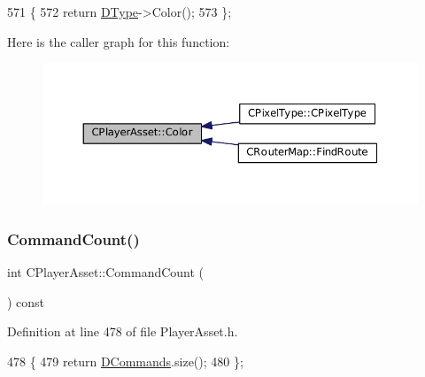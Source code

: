 \begin{DoxyCode}
571                                   \{
572             \textcolor{keywordflow}{return} \hyperlink{classCPlayerAsset_a5d61f73471e1e6f0a6ab15f2ffa7b359}{DType}->Color();  
573         \};
\end{DoxyCode}
Here is the caller graph for this function\+:
\nopagebreak
\begin{figure}[H]
\begin{center}
\leavevmode
\includegraphics[width=350pt]{classCPlayerAsset_a969e6e60c6343186d2b9a6cddd6654f8_icgraph}
\end{center}
\end{figure}
\hypertarget{classCPlayerAsset_a5349f1cee794bd34f2255aa6b3177344}{}\label{classCPlayerAsset_a5349f1cee794bd34f2255aa6b3177344} 
\subsubsection{\texorpdfstring{Command\+Count()}{CommandCount()}}
{\footnotesize\ttfamily int C\+Player\+Asset\+::\+Command\+Count (\begin{DoxyParamCaption}{ }\end{DoxyParamCaption}) const\hspace{0.3cm}{\ttfamily [inline]}}



Definition at line 478 of file Player\+Asset.\+h.


\begin{DoxyCode}
478                                 \{
479             \textcolor{keywordflow}{return} \hyperlink{classCPlayerAsset_a4d3b96106d3b1c1020f98005884d2a87}{DCommands}.size();  
480         \};
\end{DoxyCode}
\hypertarget{classCPlayerAsset_ab1667cc26c3439f868708af9d0fc1bda}{}\label{classCPlayerAsset_ab1667cc26c3439f868708af9d0fc1bda} 
